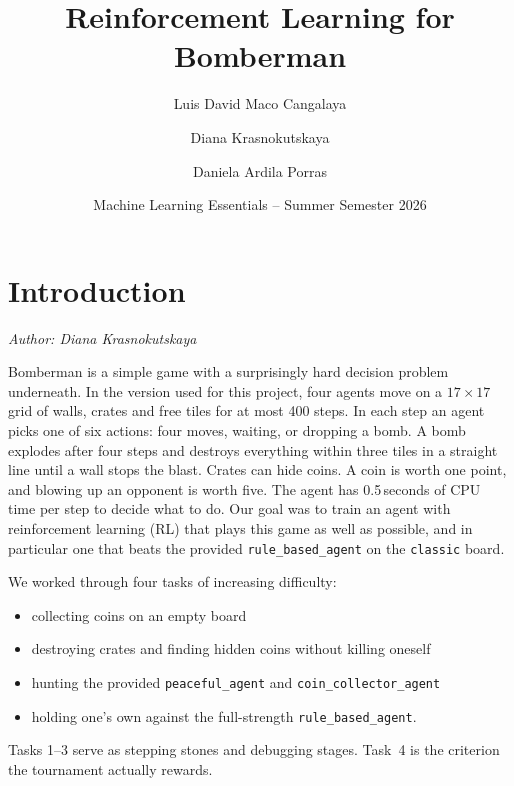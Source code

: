 \documentclass[11pt]{article}
\title{\textbf{Reinforcement Learning for Bomberman}}
\author{Luis David Maco Cangalaya \and Diana Krasnokutskaya \and Daniela Ardila Porras}
\date{Machine Learning Essentials -- Summer Semester 2026}
\newcommand{\authorline}[1]{\noindent\textit{Author: #1}\par\medskip}
\newcommand{\code}[1]{\texttt{#1}}
\begin{document}
\maketitle

\section{Introduction}
\label{sec:intro}

\authorline{Diana Krasnokutskaya}

Bomberman is a simple game with a surprisingly hard decision problem underneath. In the
version used for this project, four agents move on a $17\times17$ grid of walls, crates and
free tiles for at most 400 steps. In each step an agent picks one of six actions: four
moves, waiting, or dropping a bomb. A bomb explodes after four steps and destroys everything
within three tiles in a straight line until a wall stops the blast. Crates can hide coins.
A coin is worth one point, and blowing up an opponent is worth five. The agent has
0.5\,seconds of CPU time per step to decide what to do. Our goal was to train an agent with
reinforcement learning (RL) that plays this game as well as possible, and in particular one
that beats the provided \code{rule\_based\_agent} on the \code{classic} board. 

\hspace{1cm}

We worked through four tasks of increasing difficulty:
\begin{itemize}
\item[(1)] collecting coins on an empty board
\item[(2)] destroying crates and finding hidden coins
without killing oneself
\item[(3)] hunting the provided \code{peaceful\_agent} and
\code{coin\_collector\_agent}
\item[(4)] holding one's own against the full-strength
\code{rule\_based\_agent}. 
\end{itemize}
Tasks 1--3 serve as stepping stones and debugging stages. Task~4 is
the criterion the tournament actually rewards.

\hspace{1cm}
\end{document}
